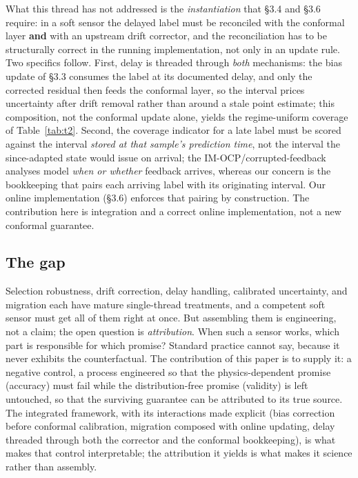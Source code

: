 What this thread has not addressed is the \emph{instantiation} that \S 3.4 and \S 3.6 require: in
a soft sensor the delayed label must be reconciled with the conformal layer \textbf{and} with
an upstream drift corrector, and the reconciliation has to be structurally correct in the running implementation, not only in an update rule. Two specifics follow. First, delay is
threaded through \emph{both} mechanisms: the bias update of \S 3.3 consumes the label at its
documented delay, and only the corrected residual then feeds the conformal layer, so
the interval prices uncertainty after drift removal rather than around a stale point
estimate; this composition, not the conformal update alone, yields the regime-uniform
coverage of Table~\ref{tab:t2}. Second, the coverage indicator for a late label must be scored
against the interval \emph{stored at that sample's prediction time}, not the interval the
since-adapted state would issue on arrival; the IM-OCP/corrupted-feedback analyses model
\emph{when or whether} feedback arrives, whereas our concern is the bookkeeping that pairs
each arriving label with its originating interval. Our online implementation (\S 3.6) enforces that pairing by construction. The contribution here is integration and a correct online implementation, not a new conformal guarantee.

\subsection{The gap}

Selection robustness, drift correction, delay handling, calibrated uncertainty, and
migration each have mature single-thread treatments, and a competent soft sensor must
get all of them right at once. But assembling them is engineering, not a claim; the
open question is \emph{attribution}. When such a sensor works, which part is
responsible for which promise? Standard practice cannot say, because it never exhibits
the counterfactual. The contribution of this paper is to supply it: a negative control,
a process engineered so that the physics-dependent promise (accuracy) must fail while
the distribution-free promise (validity) is left untouched, so that the surviving
guarantee can be attributed to its true source. The integrated framework, with its
interactions made explicit (bias correction before conformal calibration, migration
composed with online updating, delay threaded through both the corrector and the
conformal bookkeeping), is what makes that control interpretable; the attribution it
yields is what makes it science rather than assembly.
